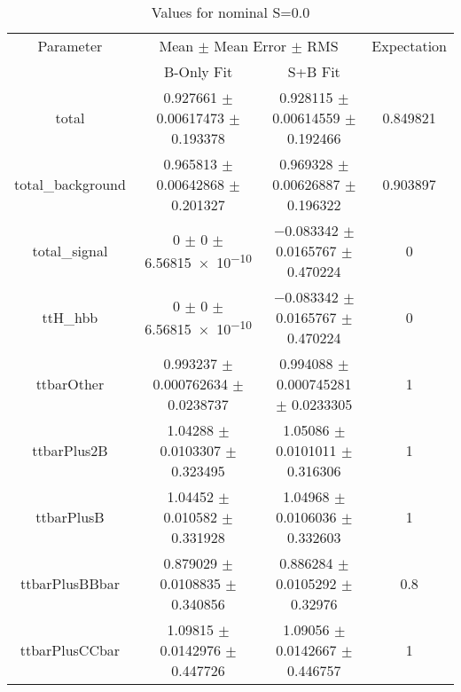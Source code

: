 \begin{table}
\centering
\caption{Values for nominal S=0.0}
\begin{tabular}{cccc}
\toprule
Parameter & \multicolumn{2}{c}{Mean $\pm$ Mean Error $\pm$ RMS} & Expectation\\
 & B-Only Fit & S+B Fit & \\
\midrule
total & \num{0.927661} $\pm$ \num{0.00617473} $\pm$ \num{0.193378} & \num{0.928115} $\pm$ \num{0.00614559} $\pm$ \num{0.192466} & \num{0.849821}\\
total\_background & \num{0.965813} $\pm$ \num{0.00642868} $\pm$ \num{0.201327} & \num{0.969328} $\pm$ \num{0.00626887} $\pm$ \num{0.196322} & \num{0.903897}\\
total\_signal & \num{0} $\pm$ \num{0} $\pm$ \num{6.56815e-10} & \num{-0.083342} $\pm$ \num{0.0165767} $\pm$ \num{0.470224} & \num{0}\\
ttH\_hbb & \num{0} $\pm$ \num{0} $\pm$ \num{6.56815e-10} & \num{-0.083342} $\pm$ \num{0.0165767} $\pm$ \num{0.470224} & \num{0}\\
ttbarOther & \num{0.993237} $\pm$ \num{0.000762634} $\pm$ \num{0.0238737} & \num{0.994088} $\pm$ \num{0.000745281} $\pm$ \num{0.0233305} & \num{1}\\
ttbarPlus2B & \num{1.04288} $\pm$ \num{0.0103307} $\pm$ \num{0.323495} & \num{1.05086} $\pm$ \num{0.0101011} $\pm$ \num{0.316306} & \num{1}\\
ttbarPlusB & \num{1.04452} $\pm$ \num{0.010582} $\pm$ \num{0.331928} & \num{1.04968} $\pm$ \num{0.0106036} $\pm$ \num{0.332603} & \num{1}\\
ttbarPlusBBbar & \num{0.879029} $\pm$ \num{0.0108835} $\pm$ \num{0.340856} & \num{0.886284} $\pm$ \num{0.0105292} $\pm$ \num{0.32976} & \num{0.8}\\
ttbarPlusCCbar & \num{1.09815} $\pm$ \num{0.0142976} $\pm$ \num{0.447726} & \num{1.09056} $\pm$ \num{0.0142667} $\pm$ \num{0.446757} & \num{1}\\
\bottomrule
\end{tabular}
\end{table}